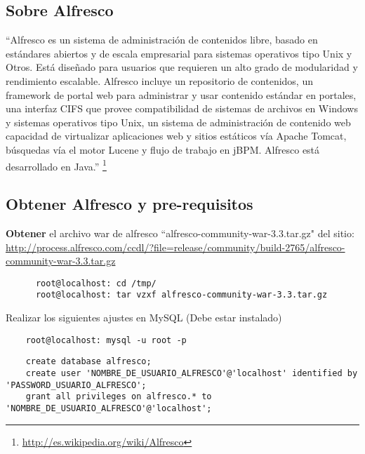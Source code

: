 \subsection{Sobre Alfresco}

``Alfresco es un sistema de administración de contenidos libre, basado en estándares abiertos y de escala empresarial para sistemas operativos tipo Unix  y Otros. Está diseñado para usuarios que requieren un alto grado de modularidad y rendimiento escalable. Alfresco incluye un repositorio de contenidos, un framework de portal web para administrar y usar contenido estándar en portales, una interfaz CIFS  que provee compatibilidad de sistemas de archivos en Windows y sistemas operativos tipo Unix, un sistema de administración de contenido web capacidad de virtualizar aplicaciones web y sitios estáticos vía Apache Tomcat, búsquedas vía el motor Lucene y flujo de trabajo en jBPM. Alfresco está desarrollado en Java.'' \footnote{\url{http://es.wikipedia.org/wiki/Alfresco}}


\subsection{Obtener Alfresco y pre-requisitos}

\textbf{Obtener} el archivo war de alfresco “alfresco-community-war-3.3.tar.gz" del sitio:\\ \url{http://process.alfresco.com/ccdl/?file=release/community/build-2765/alfresco-community-war-3.3.tar.gz}
    \lstset{language=sh,label=alfresco_obteniendo}
    \begin{lstlisting}
      root@localhost: cd /tmp/ 
      root@localhost: tar vzxf alfresco-community-war-3.3.tar.gz
    \end{lstlisting}

Realizar los siguientes ajustes en MySQL (Debe estar instalado) 
    \lstset{language=sh,label=alfresco_entrandoAMYSQL}
    \begin{lstlisting}
    root@localhost: mysql -u root -p
    \end{lstlisting}

    \lstset{language=SQL,label=alfresco_CreandoBaseDatos}
    \begin{lstlisting}
    create database alfresco;
    create user 'NOMBRE_DE_USUARIO_ALFRESCO'@'localhost' identified by 'PASSWORD_USUARIO_ALFRESCO';
    grant all privileges on alfresco.* to 'NOMBRE_DE_USUARIO_ALFRESCO'@'localhost';
    \end{lstlisting}

